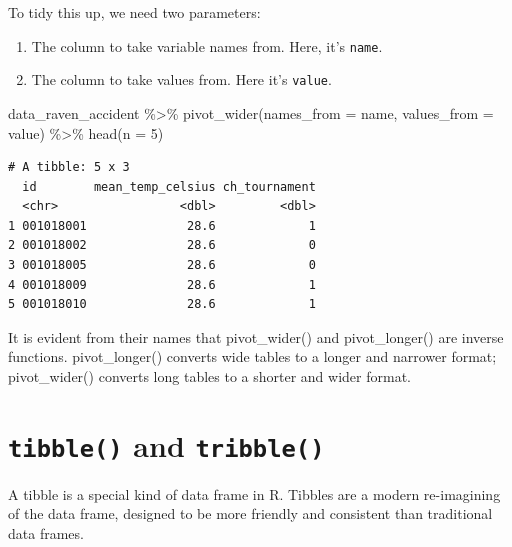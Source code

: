 \documentclass[
  letterpaper,
]{book}
\newenvironment{Shaded}{\begin{snugshade}}{\end{snugshade}}
\newcommand{\AttributeTok}[1]{\textcolor[rgb]{0.40,0.45,0.13}{#1}}
\newcommand{\DecValTok}[1]{\textcolor[rgb]{0.68,0.00,0.00}{#1}}
\newcommand{\FunctionTok}[1]{\textcolor[rgb]{0.28,0.35,0.67}{#1}}
\newcommand{\NormalTok}[1]{\textcolor[rgb]{0.00,0.23,0.31}{#1}}
\newcommand{\SpecialCharTok}[1]{\textcolor[rgb]{0.37,0.37,0.37}{#1}}
\providecommand{\tightlist}{%
  \setlength{\itemsep}{0pt}\setlength{\parskip}{0pt}}\usepackage{longtable,booktabs,array}
\begin{document}
To tidy this up, we need two parameters:

\begin{enumerate}
\def\labelenumi{\arabic{enumi}.}
\tightlist
\item
  The column to take variable names from. Here, it's \texttt{name}.
\item
  The column to take values from. Here it's \texttt{value}.
\end{enumerate}

\begin{Shaded}
\begin{Highlighting}[]
\NormalTok{data\_raven\_accident }\SpecialCharTok{\%\textgreater{}\%} \FunctionTok{pivot\_wider}\NormalTok{(}\AttributeTok{names\_from =}\NormalTok{ name, }\AttributeTok{values\_from =}\NormalTok{ value) }\SpecialCharTok{\%\textgreater{}\%} \FunctionTok{head}\NormalTok{(}\AttributeTok{n =} \DecValTok{5}\NormalTok{)}
\end{Highlighting}
\end{Shaded}

\begin{verbatim}
# A tibble: 5 x 3
  id        mean_temp_celsius ch_tournament
  <chr>                 <dbl>         <dbl>
1 001018001              28.6             1
2 001018002              28.6             0
3 001018005              28.6             0
4 001018009              28.6             1
5 001018010              28.6             1
\end{verbatim}

It is evident from their names that pivot\_wider() and pivot\_longer()
are inverse functions. pivot\_longer() converts wide tables to a longer
and narrower format; pivot\_wider() converts long tables to a shorter
and wider format.

\hypertarget{tibble-and-tribble}{%
\section{\texorpdfstring{\texttt{tibble()} and
\texttt{tribble()}}{tibble() and tribble()}}\label{tibble-and-tribble}}

A tibble is a special kind of data frame in R. Tibbles are a modern
re-imagining of the data frame, designed to be more friendly and
consistent than traditional data frames.
\end{document}
